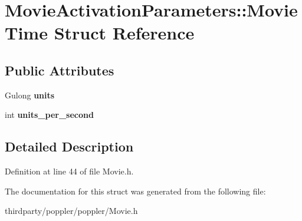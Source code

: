 \hypertarget{struct_movie_activation_parameters_1_1_movie_time}{}\section{Movie\+Activation\+Parameters\+:\+:Movie\+Time Struct Reference}
\label{struct_movie_activation_parameters_1_1_movie_time}
\subsection*{Public Attributes}
\begin{DoxyCompactItemize}
\item 
\mbox{\label{struct_movie_activation_parameters_1_1_movie_time_a7d7aefc7e1066aa8c083e1bea654699c}} 
Gulong {\bfseries units}
\item 
\mbox{\label{struct_movie_activation_parameters_1_1_movie_time_a0a1dcf8d5b066683e8c5f70c674c3f74}} 
int {\bfseries units\+\_\+per\+\_\+second}
\end{DoxyCompactItemize}


\subsection{Detailed Description}


Definition at line 44 of file Movie.\+h.



The documentation for this struct was generated from the following file\+:\begin{DoxyCompactItemize}
\item 
thirdparty/poppler/poppler/Movie.\+h\end{DoxyCompactItemize}
